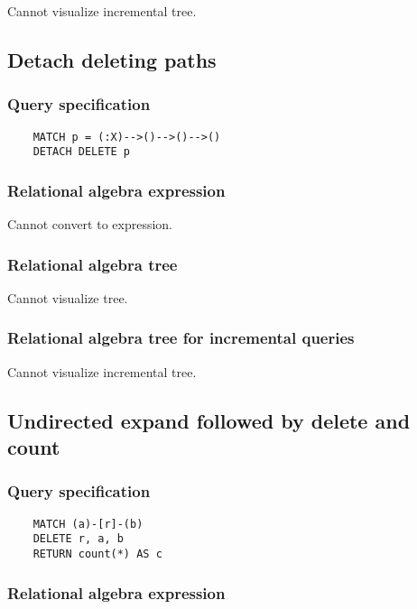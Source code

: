 	Cannot visualize incremental tree.
	\subsection{Detach deleting paths}

	\subsubsection*{Query specification}

	\begin{lstlisting}
	MATCH p = (:X)-->()-->()-->()
	DETACH DELETE p
	\end{lstlisting}


	\subsubsection*{Relational algebra expression}

	Cannot convert to expression.

	\subsubsection*{Relational algebra tree}

	Cannot visualize tree.

	\subsubsection*{Relational algebra tree for incremental queries}

	Cannot visualize incremental tree.
	\subsection{Undirected expand followed by delete and count}

	\subsubsection*{Query specification}

	\begin{lstlisting}
	MATCH (a)-[r]-(b)
	DELETE r, a, b
	RETURN count(*) AS c
	\end{lstlisting}


	\subsubsection*{Relational algebra expression}

